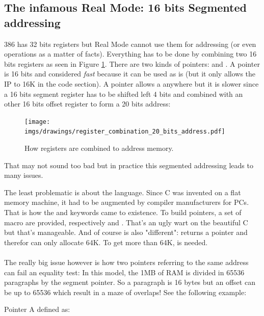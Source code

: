 \documentclass[book.tex]{subfiles}
\begin{document}
\subsection{The infamous Real Mode: 16 bits Segmented addressing}
386 has 32 bits registers but Real Mode cannot use them for addressing (or even operations as a matter of facts). Everything has to be done by combining two 16 bits registers as seen in Figure \ref{fig:register_comb_to_20_bits}. There are two kinds of pointers:  and . A  pointer is 16 bits and considered \emph{fast} because it can be used as is (but it only allows the IP to  16K in the code section). A  pointer allows a  anywhere but it is slower since a 16 bits segment register has to be shifted left 4 bits and combined with an other 16 bits offset register to form a 20 bits address:\\
\begin{figure}[H]
\centering
\texttt{[image: imgs/drawings/register\_combination\_20\_bits\_address.pdf]}
\caption{How registers are combined to address memory.}
\label{fig:register_comb_to_20_bits}
\end{figure}
That may not sound too bad but in practice this segmented addressing leads to many issues.\\
\par 
The least problematic is about the language. Since C was invented on a flat memory machine, it had to be augmented by compiler manufacturers for PCs. That is how the  and  keywords came to existence. To build pointers, a set of macro are provided, respectively  and . That's an ugly wart on the beautiful C but that's manageable. And of course  is also "different":  returns a  pointer and therefor can only allocate 64K. To get more than 64K,  is needed.\\
\\
The really big issue however is how two pointers referring to the same address can fail an equality test: In this model, the 1MB of RAM is divided in 65536 paragraphs by the segment pointer. So a paragraph is 16 bytes but an offset can be up to 65536 which result in a maze of overlaps! See the following example:\\
\par
Pointer A defined as:\\
\par
\begin{minipage}{\textwidth}

\end{minipage}
\end{document}
